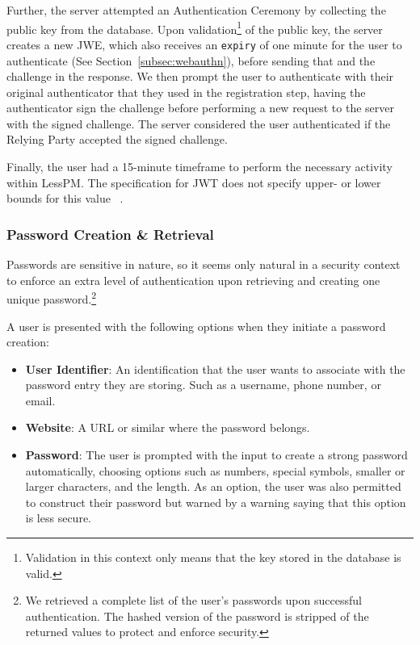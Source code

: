 Further, the server attempted an Authentication Ceremony by collecting the
public key from the database.
Upon validation\footnote{
  Validation in this context only means that the key stored in the database is
  valid.
} of the public key, the server creates a new JWE, which also receives an
\texttt{expiry} of one minute for the user to authenticate (See
Section~\ref{subsec:webauthn}), before sending that and the challenge in the
response.
We then prompt the user to authenticate with their original authenticator
that they used in the registration step, having the authenticator sign the
challenge before performing a new request to the server with the signed
challenge.
The server considered the user authenticated if the Relying Party accepted the
signed challenge.

Finally, the user had a 15-minute timeframe to perform the necessary activity
within LessPM\@.
The specification for JWT does not specify upper- or lower bounds for this
value ~\cite{RFC7519}.

\subsubsection{Password Creation \& Retrieval}\label{subsubsec:creation-and-retrieval}
Passwords are sensitive in nature, so it seems only natural in a security
context to enforce an extra level of authentication upon retrieving and creating
one unique password.\footnote{
  We retrieved a complete list of the user's passwords upon successful authentication.
  The hashed version of the password is stripped of the returned values to protect and enforce security.
}

A user is presented with the following options when they initiate a password
creation:

\begin{itemize}
  \item \textbf{User Identifier}: An identification that the user wants to
  associate with the password entry they are storing.
  Such as a username, phone number, or email.
  \item \textbf{Website}: A URL or similar where the password belongs.
  \item \textbf{Password}: The user is prompted with the input to create a
  strong password automatically, choosing options such as numbers, special
  symbols, smaller or larger characters, and the length.
  As an option, the user was also permitted to construct their password but
  warned by a warning saying that this option is less secure.
\end{itemize}

